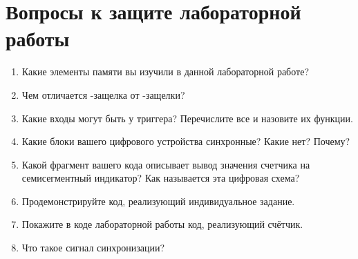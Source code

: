 \section{Вопросы к защите лабораторной работы}

\begin{enumerate}%
  \item Какие элементы памяти вы изучили в данной лабораторной работе?
  \item Чем отличается -защелка от -защелки?
  \item Какие входы могут быть у триггера? Перечислите все и назовите их функции.
  \item Какие блоки вашего цифрового устройства синхронные? Какие нет? Почему?
  \item Какой фрагмент вашего кода описывает вывод значения счетчика на семисегментный индикатор? Как называется эта цифровая схема?
  \item Продемонстрируйте код, реализующий индивидуальное задание.
  \item Покажите в коде лабораторной работы код, реализующий счётчик.
  \item Что такое сигнал синхронизации?
\end{enumerate}
